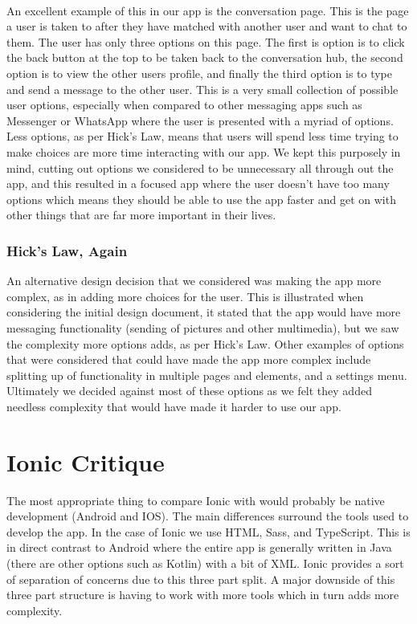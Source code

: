 \documentclass[a4paper, 11pt]{article}
\begin{document}
~\\
An excellent example of this in our app is the conversation page. This is the page a user is taken to after they have matched with another user and want to chat to them. The user has only three options on this page. The first is option is to click the back button at the top to be taken back to the conversation hub, the second option is to view the other users profile, and finally the third option is to type and send a message to the other user. This is a very small collection of possible user options, especially when compared to other messaging apps such as Messenger or WhatsApp where the user is presented with a myriad of options. Less options, as per Hick's Law, means that users will spend less time trying to make choices are more time interacting with our app. We kept this purposely in mind, cutting out options we considered to be unnecessary all through out the app, and this resulted in a focused app where the user doesn't have too many options which means they should be able to use the app faster and get on with other things that are far more important in their lives.

\subsubsection{Hick's Law, Again}

An alternative design decision that we considered was making the app more complex, as in adding more choices for the user. This is illustrated when considering the initial design document, it stated that the app would have more messaging functionality (sending of pictures and other multimedia), but we saw the complexity more options adds, as per Hick's Law. Other examples of options that were considered that could have made the app more complex include splitting up of functionality in multiple pages and elements, and a settings menu. Ultimately we decided against most of these options as we felt they added needless complexity that would have made it harder to use our app.
\section{Ionic Critique}
The most appropriate thing to compare Ionic with would probably be native development (Android and IOS). The main differences surround the tools used to develop the app. In the case of Ionic we use HTML, Sass, and TypeScript. This is in direct contrast to Android where the entire app is generally written in Java (there are other options such as Kotlin) with a bit of XML. Ionic provides a sort of separation of concerns due to this three part split. A major downside of this three part structure is having to work with more tools which in turn adds more complexity. 
\end{document}
